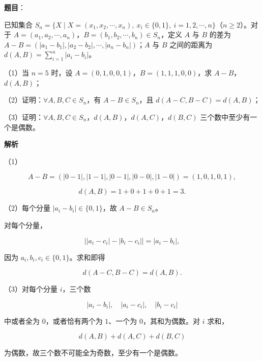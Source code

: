 \begin{answer}

\textbf{题目}：

已知集合 $S_n=\{X\mid X=(x_1,x_2,\cdots,x_n),\ x_i\in\{0,1\},\ i=1,2,\cdots,n\}$（$n\geqslant2$）。对于 $A=(a_1,a_2,\cdots,a_n)$，$B=(b_1,b_2,\cdots,b_n)\in S_n$，定义 $A$ 与 $B$ 的差为 $A-B=(|a_1-b_1|,|a_2-b_2|,\cdots,|a_n-b_n|)$；$A$ 与 $B$ 之间的距离为 $d(A,B)=\sum\limits_{i=1}^n|a_i-b_i|$。

（1）当 $n=5$ 时，设 $A=(0,1,0,0,1)$，$B=(1,1,1,0,0)$，求 $A-B$，$d(A,B)$；

（2）证明：$\forall A,B,C\in S_n$，有 $A-B\in S_n$，且 $d(A-C,B-C)=d(A,B)$；

（3）证明：$\forall A,B,C\in S_n$，$d(A,B)$，$d(A,C)$，$d(B,C)$ 三个数中至少有一个是偶数。

\textbf{解析}

（1）

\nopagebreak[4]
\[A-B=(|0-1|,|1-1|,|0-1|,|0-0|,|1-0|)
=(1,0,1,0,1),\]

\nopagebreak[4]
\[d(A,B)=1+0+1+0+1=3.\]

（2）每个分量 $|a_i-b_i|\in\{0,1\}$，故 $A-B\in S_n$。

对每个分量，

\nopagebreak[4]
\[\big||a_i-c_i|-|b_i-c_i|\big|=|a_i-b_i|,\]

因为 $a_i,b_i,c_i\in\{0,1\}$。求和即得

\nopagebreak[4]
\[d(A-C,B-C)=d(A,B).\]

（3）对每个分量 $i$，三个数

\nopagebreak[4]
\[|a_i-b_i|,\quad|a_i-c_i|,\quad|b_i-c_i|\]

中或者全为 $0$，或者恰有两个为 $1$、一个为 $0$，其和为偶数。对 $i$ 求和，

\nopagebreak[4]
\[d(A,B)+d(A,C)+d(B,C)\]

为偶数，故三个数不可能全为奇数，至少有一个是偶数。


\end{answer}